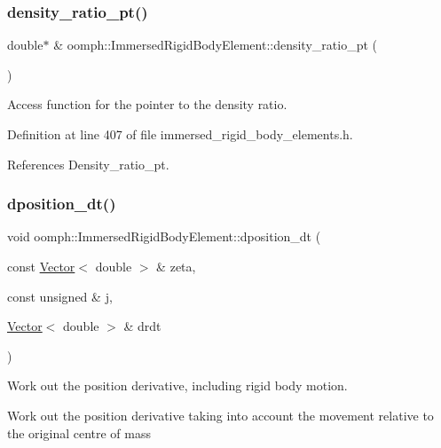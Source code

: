 \subsubsection{\texorpdfstring{density\+\_\+ratio\+\_\+pt()}{density\_ratio\_pt()}}
{\footnotesize\ttfamily double$\ast$ \& oomph\+::\+Immersed\+Rigid\+Body\+Element\+::density\+\_\+ratio\+\_\+pt (\begin{DoxyParamCaption}{ }\end{DoxyParamCaption})\hspace{0.3cm}{\ttfamily [inline]}}



Access function for the pointer to the density ratio. 



Definition at line 407 of file immersed\+\_\+rigid\+\_\+body\+\_\+elements.\+h.



References Density\+\_\+ratio\+\_\+pt.

\mbox{\label{classoomph_1_1ImmersedRigidBodyElement_a3b25cfe303aa51f26bd27312abccbba4}} 
\subsubsection{\texorpdfstring{dposition\+\_\+dt()}{dposition\_dt()}}
{\footnotesize\ttfamily void oomph\+::\+Immersed\+Rigid\+Body\+Element\+::dposition\+\_\+dt (\begin{DoxyParamCaption}\item[{const \hyperlink{classoomph_1_1Vector}{Vector}$<$ double $>$ \&}]{zeta,  }\item[{const unsigned \&}]{j,  }\item[{\hyperlink{classoomph_1_1Vector}{Vector}$<$ double $>$ \&}]{drdt }\end{DoxyParamCaption})\hspace{0.3cm}{\ttfamily [virtual]}}



Work out the position derivative, including rigid body motion. 

Work out the position derivative taking into account the movement relative to the original centre of mass 

